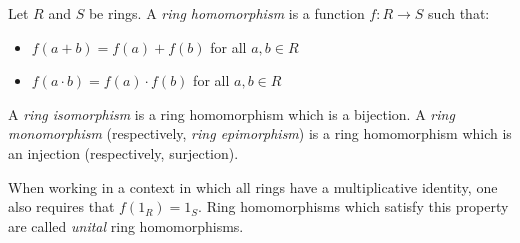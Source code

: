 \documentclass{article}
\begin{document}
Let $R$ and $S$ be rings. A \emph{ring homomorphism} is a function $f: R \longrightarrow S$ such that:
\begin{itemize}
\item $f(a+b) = f(a)+f(b)$ for all $a,b \in R$
\item $f(a\cdot b) = f(a) \cdot f(b)$ for all $a,b \in R$
\end{itemize}

A \emph{ring isomorphism} is a ring homomorphism which is a bijection. A \emph{ring monomorphism} (respectively, \emph{ring epimorphism}) is a ring homomorphism which is an injection (respectively, surjection).

When working in a context in which all rings have a multiplicative identity, one also requires that $f(1_R) = 1_S$. Ring homomorphisms which satisfy this property are called \emph{unital} ring homomorphisms.
\end{document}
